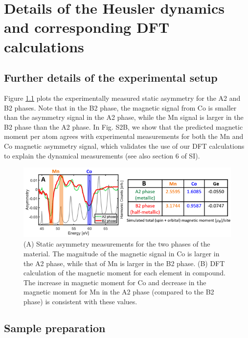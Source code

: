 \chapter{Details of the Heusler dynamics and corresponding DFT calculations}	\OnePageChapter         %

\section{Further details of the experimental setup}

Figure \ref{fig: Heuslerstatic} plots the experimentally measured static asymmetry for the A2 and B2 phases. Note that in the B2 phase, the magnetic signal from Co is smaller than the asymmetry signal in the A2 phase, while the Mn signal is larger in the B2 phase than the A2 phase. In Fig. S2B, we show that the predicted magnetic moment per atom agrees with experimental measurements for both the Mn and Co magnetic asymmetry signal, which validates the use of our DFT calculations to explain the dynamical measurements (see also section 6 of SI).

\begin{figure}[htbp]
	\begin{center}
		\includegraphics[width=150mm]{figs/Heuslerstatic}
	\end{center}
	\caption{(A) Static asymmetry measurements for the two phases of the material. The magnitude of the magnetic signal in Co is larger in the A2 phase, while that of Mn is larger in the B2 phase. (B) DFT calculation of the magnetic moment for each element in compound. The increase in magnetic moment for Co and decrease in the magnetic moment for Mn in the A2 phase (compared to the B2 phase) is consistent with these values.}
	\label{fig: Heuslerstatic}
\end{figure}

\section{Sample preparation}

